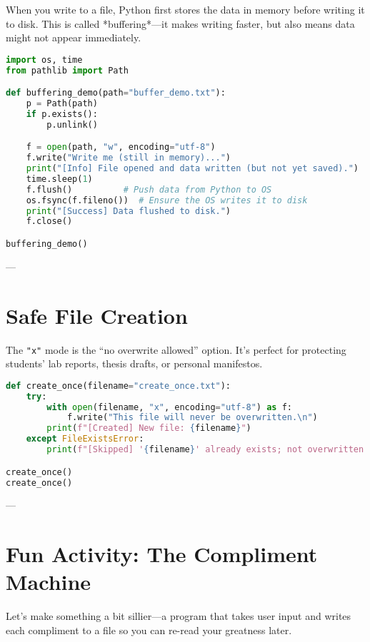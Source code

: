 When you write to a file, Python first stores the data in memory before writing it to disk.  
This is called *buffering*---it makes writing faster, but also means data might not appear immediately.

\begin{lstlisting}[language=Python, caption={Example 5: Forcing a buffer flush.}]
import os, time
from pathlib import Path

def buffering_demo(path="buffer_demo.txt"):
    p = Path(path)
    if p.exists():
        p.unlink()

    f = open(path, "w", encoding="utf-8")
    f.write("Write me (still in memory)...")
    print("[Info] File opened and data written (but not yet saved).")
    time.sleep(1)
    f.flush()          # Push data from Python to OS
    os.fsync(f.fileno())  # Ensure the OS writes it to disk
    print("[Success] Data flushed to disk.")
    f.close()

buffering_demo()
\end{lstlisting}

---

\section{Safe File Creation}

The \texttt{"x"} mode is the “no overwrite allowed” option.  
It’s perfect for protecting students’ lab reports, thesis drafts, or personal manifestos.

\begin{lstlisting}[language=Python, caption={Example 6: Using 'x' mode to prevent overwrite.}]
def create_once(filename="create_once.txt"):
    try:
        with open(filename, "x", encoding="utf-8") as f:
            f.write("This file will never be overwritten.\n")
        print(f"[Created] New file: {filename}")
    except FileExistsError:
        print(f"[Skipped] '{filename}' already exists; not overwritten.")

create_once()
create_once()
\end{lstlisting}

---

\section{Fun Activity: The Compliment Machine}

Let’s make something a bit sillier---a program that takes user input and writes  
each compliment to a file so you can re-read your greatness later.

